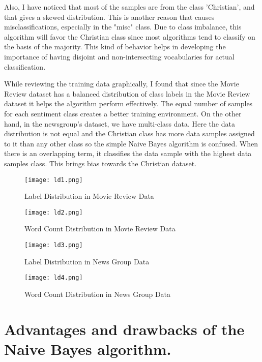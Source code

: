 \documentclass{article}
\begin{document}
Also, I have noticed that most of the samples are from the class 'Christian', and that gives a skewed distribution. This is another reason that causes misclassifications, especially in the "misc" class. Due to class imbalance, this algorithm will favor the Christian class since most algorithms tend to classify on the basis of the majority. This kind of behavior helps in developing the importance of having disjoint and non-intersecting vocabularies for actual classification. 

While reviewing the training data graphically, I found that since the Movie Review dataset has a balanced distribution of class labels in the Movie Review dataset it helps the algorithm perform effectively. The equal number of samples for each sentiment class creates a better training environment. On the other hand, in the newsgroup’s dataset, we have multi-class data. Here the data distribution is not equal and the Christian class has more data samples assigned to it than any other class so the simple Naive Bayes algorithm is confused. When there is an overlapping term, it classifies the data sample with the highest data samples class. This brings bias towards the Christian dataset.

\begin{figure}[H]
    \centering
    \texttt{[image: ld1.png]}
    \caption{Label Distribution in Movie Review Data}
    \label{fig:your_label}
\end{figure}

\begin{figure}[H]
    \centering
    \texttt{[image: ld2.png]}
    \caption{Word Count Distribution in Movie Review Data}
    \label{fig:your_label}
\end{figure}

\begin{figure}[H]
    \centering
    \texttt{[image: ld3.png]}
    \caption{Label Distribution in News Group Data}
    \label{fig:your_label}
\end{figure}

\begin{figure}[H]
    \centering
    \texttt{[image: ld4.png]}
    \caption{Word Count Distribution in News Group Data}
    \label{fig:your_label}
\end{figure}

\section*{Advantages and drawbacks of the Naive Bayes algorithm.}
\end{document}
